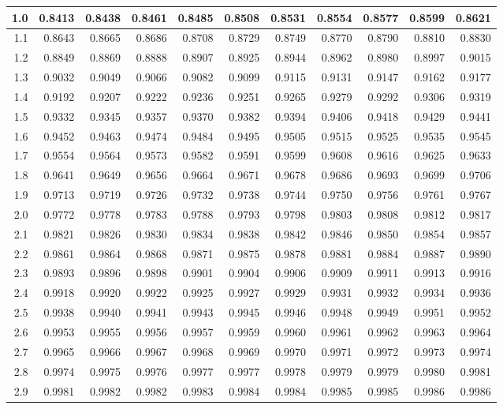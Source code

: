 \begin{center}
\begin{tabular}{|r|r@{\ }r@{\ }r@{\ }r@{\ }r@{\ }r@{\ }r@{\ }r@{\ }r@{\ }r@{\ }|}
    \hline
    1.0&0.8413&0.8438&0.8461&0.8485&0.8508&0.8531&0.8554&0.8577&0.8599&0.8621\\
    \hline
    1.1&0.8643&0.8665&0.8686&0.8708&0.8729&0.8749&0.8770&0.8790&0.8810&0.8830\\
    \hline
    1.2&0.8849&0.8869&0.8888&0.8907&0.8925&0.8944&0.8962&0.8980&0.8997&0.9015\\
    \hline
    1.3&0.9032&0.9049&0.9066&0.9082&0.9099&0.9115&0.9131&0.9147&0.9162&0.9177\\
    \hline
    1.4&0.9192&0.9207&0.9222&0.9236&0.9251&0.9265&0.9279&0.9292&0.9306&0.9319\\
    \hline
    1.5&0.9332&0.9345&0.9357&0.9370&0.9382&0.9394&0.9406&0.9418&0.9429&0.9441\\
    \hline
    1.6&0.9452&0.9463&0.9474&0.9484&0.9495&0.9505&0.9515&0.9525&0.9535&0.9545\\
    \hline
    1.7&0.9554&0.9564&0.9573&0.9582&0.9591&0.9599&0.9608&0.9616&0.9625&0.9633\\
    \hline
    1.8&0.9641&0.9649&0.9656&0.9664&0.9671&0.9678&0.9686&0.9693&0.9699&0.9706\\
    \hline
    1.9&0.9713&0.9719&0.9726&0.9732&0.9738&0.9744&0.9750&0.9756&0.9761&0.9767\\
    \hline
    2.0&0.9772&0.9778&0.9783&0.9788&0.9793&0.9798&0.9803&0.9808&0.9812&0.9817\\
    \hline
    2.1&0.9821&0.9826&0.9830&0.9834&0.9838&0.9842&0.9846&0.9850&0.9854&0.9857\\
    \hline
    2.2&0.9861&0.9864&0.9868&0.9871&0.9875&0.9878&0.9881&0.9884&0.9887&0.9890\\
    \hline
    2.3&0.9893&0.9896&0.9898&0.9901&0.9904&0.9906&0.9909&0.9911&0.9913&0.9916\\
    \hline
    2.4&0.9918&0.9920&0.9922&0.9925&0.9927&0.9929&0.9931&0.9932&0.9934&0.9936\\
    \hline
    2.5&0.9938&0.9940&0.9941&0.9943&0.9945&0.9946&0.9948&0.9949&0.9951&0.9952\\
    \hline
    2.6&0.9953&0.9955&0.9956&0.9957&0.9959&0.9960&0.9961&0.9962&0.9963&0.9964\\
    \hline
    2.7&0.9965&0.9966&0.9967&0.9968&0.9969&0.9970&0.9971&0.9972&0.9973&0.9974\\
    \hline
    2.8&0.9974&0.9975&0.9976&0.9977&0.9977&0.9978&0.9979&0.9979&0.9980&0.9981\\
    \hline
    2.9&0.9981&0.9982&0.9982&0.9983&0.9984&0.9984&0.9985&0.9985&0.9986&0.9986\\

\end{tabular}
\end{center}
